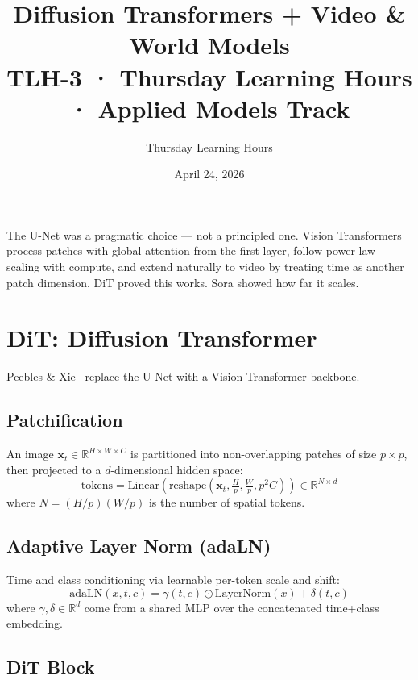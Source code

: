 \documentclass[11pt, a4paper]{article}
\title{\color{copper}\textbf{Diffusion Transformers + Video \& World Models}\\[4pt]
  \large TLH-3 · Thursday Learning Hours · Applied Models Track}
\author{Thursday Learning Hours}
\date{April 24, 2026}
\theoremstyle{definition}
\begin{document}
\maketitle

\begin{tcolorbox}[colback=ivory, colframe=copper, title=\textbf{Core Thesis}]
The U-Net was a pragmatic choice — not a principled one. Vision Transformers process patches
with global attention from the first layer, follow power-law scaling with compute, and extend
naturally to video by treating time as another patch dimension. DiT proved this works.
Sora showed how far it scales.
\end{tcolorbox}

\tableofcontents
\newpage

\section{DiT: Diffusion Transformer}

Peebles \& Xie~\cite{peebles2023dit} replace the U-Net with a Vision Transformer backbone.

\subsection{Patchification}

An image $\bm{x}_t \in \mathbb{R}^{H \times W \times C}$ is partitioned into non-overlapping
patches of size $p \times p$, then projected to a $d$-dimensional hidden space:
\begin{equation}
  \text{tokens} = \text{Linear}(\text{reshape}(\bm{x}_t, \tfrac{H}{p}, \tfrac{W}{p}, p^2 C)) \in \mathbb{R}^{N \times d}
\end{equation}
where $N = (H/p)(W/p)$ is the number of spatial tokens.

\subsection{Adaptive Layer Norm (adaLN)}

Time and class conditioning via learnable per-token scale and shift:
\begin{equation}
  \text{adaLN}(x, t, c) = \gamma(t, c) \odot \text{LayerNorm}(x) + \delta(t, c)
\end{equation}
where $\gamma, \delta \in \mathbb{R}^d$ come from a shared MLP over the concatenated time+class embedding.

\subsection{DiT Block}
\end{document}
